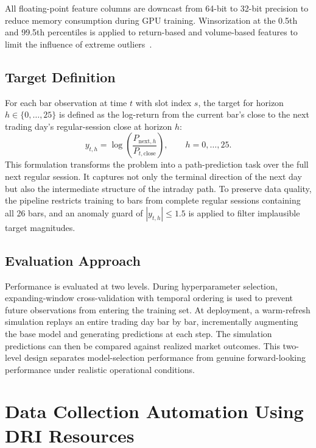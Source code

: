 \documentclass[conference]{IEEEtran}
\begin{document}
All floating-point feature columns are downcast from 64-bit to 32-bit precision to reduce memory consumption during GPU training. Winsorization at the 0.5th and 99.5th percentiles is applied to return-based and volume-based features to limit the influence of extreme outliers~\cite{aggarwal2015datamining}.

\subsection{Target Definition}\label{sec:targets}
For each bar observation at time $t$ with slot index $s$, the target for horizon $h \in \{0,\dots,25\}$ is defined as the log-return from the current bar's close to the next trading day's regular-session close at horizon $h$:
\[
y_{t,h} = \log\!\left(\frac{P_{\mathrm{next},h}}{P_{t,\mathrm{close}}}\right), \qquad h=0,\dots,25.
\]
This formulation transforms the problem into a path-prediction task over the full next regular session. It captures not only the terminal direction of the next day but also the intermediate structure of the intraday path. To preserve data quality, the pipeline restricts training to bars from complete regular sessions containing all 26 bars, and an anomaly guard of $|y_{t,h}| \leq 1.5$ is applied to filter implausible target magnitudes.

\subsection{Evaluation Approach}
Performance is evaluated at two levels. During hyperparameter selection, expanding-window cross-validation with temporal ordering is used to prevent future observations from entering the training set. At deployment, a warm-refresh simulation replays an entire trading day bar by bar, incrementally augmenting the base model and generating predictions at each step. The simulation predictions can then be compared against realized market outcomes. This two-level design separates model-selection performance from genuine forward-looking performance under realistic operational conditions.

\section{Data Collection Automation Using DRI Resources}\label{sec:DataCollection}
\end{document}
